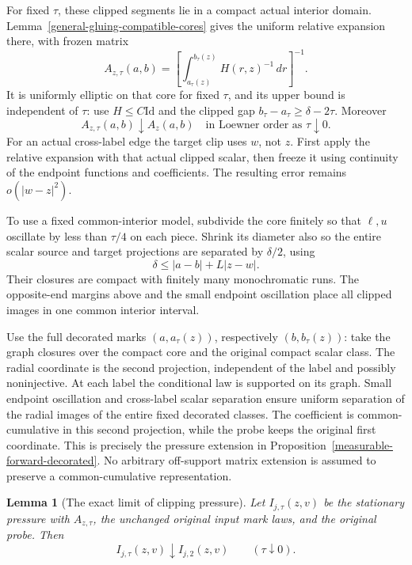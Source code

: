\documentclass[11pt,reqno]{amsart}
\newtheorem{lemma}[theorem]{Lemma}
\theoremstyle{definition}
\theoremstyle{remark}
\numberwithin{equation}{section}
\begin{document}
For fixed \(\tau\), these clipped segments lie in a compact actual
interior domain. Lemma~\ref{general-gluing-compatible-cores} gives the
uniform relative expansion there, with frozen matrix
\begin{equation}
\label{general-gluing-clipped-matrix}
 A_{z,\tau}(a,b)
   =\left[\int_{a_\tau(z)}^{b_\tau(z)}H(r,z)^{-1}\,dr\right]^{-1}.
\end{equation}
It is uniformly elliptic on that core for fixed \(\tau\), and its upper
bound is independent of \(\tau\): use \(H\le C\mathrm{Id}\) and the
clipped gap \(b_\tau-a_\tau\ge\delta-2\tau\). Moreover
\begin{equation}
\label{general-gluing-matrix-monotonicity}
 A_{z,\tau}(a,b)\downarrow A_z(a,b)
                  \quad\text{in Loewner order as }\tau\downarrow0.
\end{equation}
For an actual cross-label edge the target clip uses \(w\), not \(z\).
First apply the relative expansion with that actual clipped scalar, then
freeze it using continuity of the endpoint functions and coefficients.
The resulting error remains \(o(|w-z|^2)\).

To use a fixed common-interior model, subdivide the core finitely so that
\(\ell,u\) oscillate by less than \(\tau/4\) on each piece. Shrink its
diameter also so the entire scalar source and target projections are
separated by \(\delta/2\), using
\[
 \delta\le |a-b|+L|z-w|.
\]
Their closures are compact with finitely many monochromatic runs. The
opposite-end margins above and the small endpoint oscillation place all
clipped images in one common interior interval.

Use the full decorated marks \((a,a_\tau(z))\), respectively
\((b,b_\tau(z))\): take the graph closures over the compact core and
the original compact scalar class. The radial coordinate is the second
projection, independent of the label and possibly noninjective. At each
label the conditional law is supported on its graph. Small endpoint
oscillation and cross-label scalar separation ensure uniform separation
of the radial images of the entire fixed decorated classes. The coefficient
is common-cumulative in this second projection, while the probe keeps the
original first coordinate. This is precisely the pressure extension in
Proposition~\ref{measurable-forward-decorated}. No arbitrary off-support
matrix extension is assumed to preserve a common-cumulative representation.

\begin{lemma}[The exact limit of clipping pressure]
\label{general-gluing-clipping-limit}
Let \(I_{j,\tau}(z,v)\) be the stationary pressure with
\(A_{z,\tau}\), the unchanged original input mark laws, and the original
probe. Then
\begin{equation}
\label{general-gluing-clipping-value}
 I_{j,\tau}(z,v)\downarrow I_{j,2}(z,v)
                          \qquad(\tau\downarrow0).
\end{equation}
\end{lemma}
\end{document}
